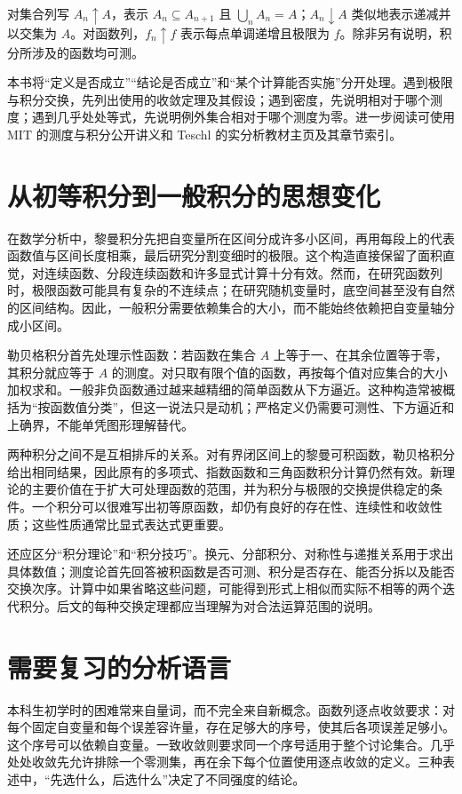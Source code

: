\documentclass[UTF8,12pt,a4paper,fontset=fandol]{ctexbook}
\begin{document}
对集合列写 $A_n\uparrow A$，表示 $A_n\subseteq A_{n+1}$ 且 $\bigcup_nA_n=A$；$A_n\downarrow A$ 类似地表示递减并以交集为 $A$。对函数列，$f_n\uparrow f$ 表示每点单调递增且极限为 $f$。除非另有说明，积分所涉及的函数均可测。

本书将“定义是否成立”“结论是否成立”和“某个计算能否实施”分开处理。遇到极限与积分交换，先列出使用的收敛定理及其假设；遇到密度，先说明相对于哪个测度；遇到几乎处处等式，先说明例外集合相对于哪个测度为零。进一步阅读可使用 MIT 的测度与积分公开讲义\cite{mit-measure}和 Teschl 的实分析教材主页及其章节索引\cite{teschl-ra}。

\section{从初等积分到一般积分的思想变化}
在数学分析中，黎曼积分先把自变量所在区间分成许多小区间，再用每段上的代表函数值与区间长度相乘，最后研究分割变细时的极限。这个构造直接保留了面积直觉，对连续函数、分段连续函数和许多显式计算十分有效。然而，在研究函数列时，极限函数可能具有复杂的不连续点；在研究随机变量时，底空间甚至没有自然的区间结构。因此，一般积分需要依赖集合的大小，而不能始终依赖把自变量轴分成小区间。

勒贝格积分首先处理示性函数：若函数在集合 $A$ 上等于一、在其余位置等于零，其积分就应等于 $A$ 的测度。对只取有限个值的函数，再按每个值对应集合的大小加权求和。一般非负函数通过越来越精细的简单函数从下方逼近。这种构造常被概括为“按函数值分类”，但这一说法只是动机；严格定义仍需要可测性、下方逼近和上确界，不能单凭图形理解替代。

两种积分之间不是互相排斥的关系。对有界闭区间上的黎曼可积函数，勒贝格积分给出相同结果，因此原有的多项式、指数函数和三角函数积分计算仍然有效。新理论的主要价值在于扩大可处理函数的范围，并为积分与极限的交换提供稳定的条件。一个积分可以很难写出初等原函数，却仍有良好的存在性、连续性和收敛性质；这些性质通常比显式表达式更重要。

还应区分“积分理论”和“积分技巧”。换元、分部积分、对称性与递推关系用于求出具体数值；测度论首先回答被积函数是否可测、积分是否存在、能否分拆以及能否交换次序。计算中如果省略这些问题，可能得到形式上相似而实际不相等的两个迭代积分。后文的每种交换定理都应当理解为对合法运算范围的说明。

\section{需要复习的分析语言}
本科生初学时的困难常来自量词，而不完全来自新概念。函数列逐点收敛要求：对每个固定自变量和每个误差容许量，存在足够大的序号，使其后各项误差足够小。这个序号可以依赖自变量。一致收敛则要求同一个序号适用于整个讨论集合。几乎处处收敛先允许排除一个零测集，再在余下每个位置使用逐点收敛的定义。三种表述中，“先选什么，后选什么”决定了不同强度的结论。
\end{document}
